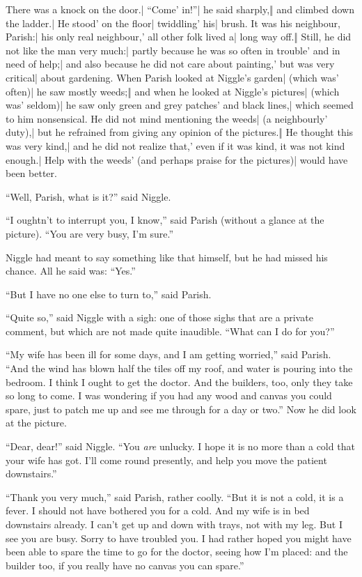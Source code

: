 \begin{itemize}
\halfone There was a knock on the door.| “Come' in!”| he said sharply,‖ and climbed down the ladder.| He stood' on the floor| twiddling' his| brush.
\halftwo It was his neighbour, Parish:| his only real neighbour,' all other folk lived a| long way off.‖ Still, he did not like the man very much:| partly because he was so often in trouble' and in need of help;| and also because he did not care about painting,' but was very critical| about gardening.
\halfone When Parish looked at Niggle’s garden| (which was' often)| he saw mostly weeds;‖ and when he looked at Niggle’s pictures| (which was' seldom)| he saw only green and grey patches' and black lines,| which seemed to him nonsensical.
\halftwo He did not mind mentioning the weeds| (a neighbourly' duty),| but he refrained from giving any opinion of the pictures.‖ He thought this was very kind,| and he did not realize that,' even if it was kind, it was not kind enough.| Help with the weeds' (and perhaps praise for the pictures)| would have been better.
\end{itemize}

“Well, Parish, what is it?” said Niggle.

“I oughtn’t to interrupt you, I know,” said Parish (without a glance at the picture). “You are very busy, I’m sure.”

Niggle had meant to say something like that himself, but he had missed his chance. All he said was: “Yes.”

“But I have no one else to turn to,” said Parish.

“Quite so,” said Niggle with a sigh: one of those sighs that are a private comment, but which are not made quite inaudible. “What can I do for you?”

“My wife has been ill for some days, and I am getting worried,” said Parish. “And the wind has blown half the tiles off my roof, and water is pouring into the bedroom. I think I ought to get the doctor. And the builders, too, only they take so long to come. I was wondering if you had any wood and canvas you could spare, just to patch me up and see me through for a day or two.” Now he did look at the picture.

“Dear, dear!” said Niggle. “You \emph{are} unlucky. I hope it is no more than a cold that your wife has got. I’ll come round presently, and help you move the patient downstairs.”

“Thank you very much,” said Parish, rather coolly. “But it is not a cold, it is a fever. I should not have bothered you for a cold. And my wife is in bed downstairs already. I can’t get up and down with trays, not with my leg. But I see you are busy. Sorry to have troubled you. I had rather hoped you might have been able to spare the time to go for the doctor, seeing how I’m placed: and the builder too, if you really have no canvas you can spare.”

